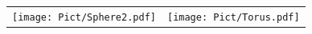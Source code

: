 \begin{center}
  \begin{tabular}{cc}
    \texttt{[image: Pict/Sphere2.pdf]}  & \texttt{[image: Pict/Torus.pdf]}
  \end{tabular}
\end{center}


